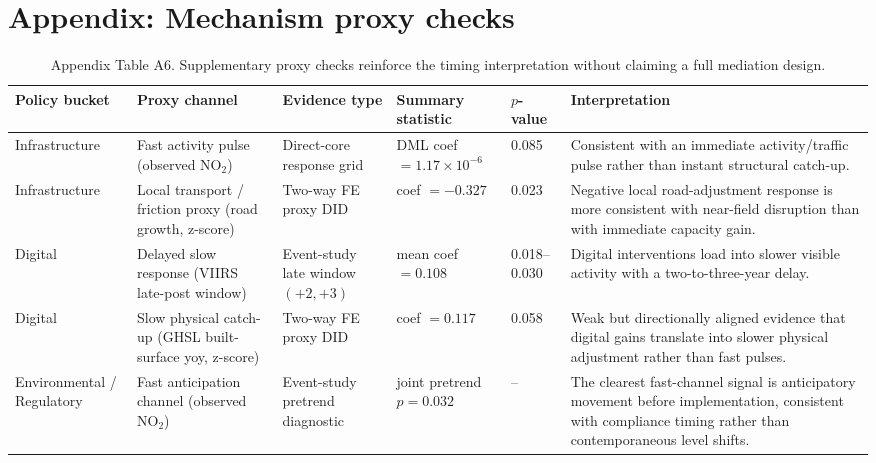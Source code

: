 \documentclass[11pt,a4paper]{article}
\begin{document}
\section{Appendix: Mechanism proxy checks}
\label{app:mechanism_proxy}

\begin{table}[H]
\centering
\caption{Appendix Table A6. Supplementary proxy checks reinforce the timing interpretation without claiming a full mediation design.}
\label{tab:mechanism_proxy_appendix}
\small
\setlength{\tabcolsep}{4pt}
\begin{tabular}{p{}p{}p{}p{}p{}p{}}
\toprule
Policy bucket & Proxy channel & Evidence type & Summary statistic & $p$-value & Interpretation \\
\midrule
Infrastructure & Fast activity pulse (observed NO$_2$) & Direct-core response grid & DML coef $=1.17\times10^{-6}$ & 0.085 & Consistent with an immediate activity/traffic pulse rather than instant structural catch-up. \\
Infrastructure & Local transport / friction proxy (road growth, z-score) & Two-way FE proxy DID & coef $=-0.327$ & 0.023 & Negative local road-adjustment response is more consistent with near-field disruption than with immediate capacity gain. \\
Digital & Delayed slow response (VIIRS late-post window) & Event-study late window $(+2,+3)$ & mean coef $=0.108$ & 0.018--0.030 & Digital interventions load into slower visible activity with a two-to-three-year delay. \\
Digital & Slow physical catch-up (GHSL built-surface yoy, z-score) & Two-way FE proxy DID & coef $=0.117$ & 0.058 & Weak but directionally aligned evidence that digital gains translate into slower physical adjustment rather than fast pulses. \\
Environmental / Regulatory & Fast anticipation channel (observed NO$_2$) & Event-study pretrend diagnostic & joint pretrend $p=0.032$ & -- & The clearest fast-channel signal is anticipatory movement before implementation, consistent with compliance timing rather than contemporaneous level shifts. \\
\bottomrule
\end{tabular}
\end{table}
\FloatBarrier
\end{document}
